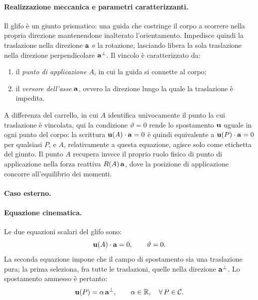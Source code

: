 \paragraph{Realizzazione meccanica e parametri caratterizzanti.}
Il glifo è un giunto prismatico: una guida che costringe il
corpo a scorrere nella propria direzione mantenendone
inalterato l'orientamento. Impedisce quindi la traslazione
nella direzione $\mathbf{a}$ e la rotazione, lasciando libera la
sola traslazione nella direzione perpendicolare $\mathbf{a}^{\perp}$.
Il vincolo è caratterizzato da:
\begin{enumerate}[label=(\roman*)]
	\item il \emph{punto di applicazione} $A$, in cui la
	guida si connette al corpo;
	\item il \emph{versore dell'asse} $\mathbf{a}$, ovvero la
	direzione lungo la quale la traslazione è impedita.
\end{enumerate}
A differenza del carrello, in cui $A$ identifica univocamente
il punto la cui traslazione è vincolata, qui la condizione
$\vartheta = 0$ rende lo spostamento $\mathbf{u}$ uguale in ogni
punto del corpo: la scrittura $\mathbf{u}(A)\cdot\mathbf{a} = 0$ è quindi
equivalente a $\mathbf{u}(P)\cdot\mathbf{a} = 0$ per qualsiasi $P$, e $A$,
relativamente a questa equazione, agisce solo come etichetta
del giunto. Il punto $A$ recupera invece il proprio ruolo
fisico di punto di applicazione nella forza reattiva
$R(A)\,\mathbf{a}$, dove la posizione di applicazione concorre
all'equilibrio dei momenti.


\paragraph{Caso esterno.}

\paragraph{Equazione cinematica.}
Le due equazioni scalari del glifo sono:
\begin{equation}
	\label{eq:glifo_cin}
	\mathbf{u}(A) \cdot \mathbf{a} = 0, \qquad
	\vartheta = 0.
\end{equation}
La seconda equazione impone che il campo di spostamento sia
una traslazione pura; la prima seleziona, fra tutte le
traslazioni, quelle nella direzione $\mathbf{a}^{\perp}$.
Lo spostamento ammesso è pertanto:
\begin{equation}\label{eq:glifo_moto_ammesso}
	\mathbf{u}(P) = \alpha\,\mathbf{a}^{\perp}, \qquad \alpha \in \mathbb{R},
	\quad \forall\, P \in \mathcal{C}.
\end{equation}

